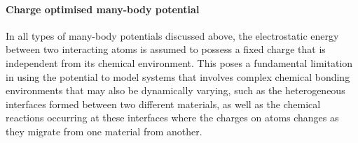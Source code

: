 \paragraph{\textbf{Charge optimised many-body potential} } In all types of many-body potentials discussed above, the electrostatic energy between two interacting atoms is assumed to possess a fixed charge that is independent from its chemical environment. This poses a fundamental limitation in using the potential to model systems that involves complex chemical bonding environments that may also be dynamically varying,\cite{liang2013classical} such as the heterogeneous interfaces formed between two different materials, as well as  the chemical reactions occurring at these interfaces where the charges on atoms changes as they migrate from one material from another. 

